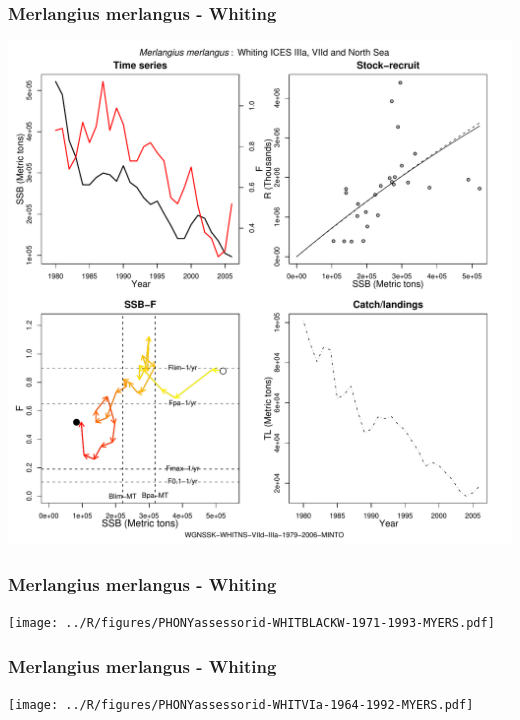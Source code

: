 \subsubsection{Merlangius merlangus - Whiting}
\begin{center}
\includegraphics[width=1.2\textwidth]{../R/figures/WGNSSK-WHITNS-VIId-IIIa-1979-2006-MINTO.pdf}
\end{center}

\subsubsection{Merlangius merlangus - Whiting}
\begin{center}
\texttt{[image: ../R/figures/PHONYassessorid-WHITBLACKW-1971-1993-MYERS.pdf]}
\end{center}

\subsubsection{Merlangius merlangus - Whiting}
\begin{center}
\texttt{[image: ../R/figures/PHONYassessorid-WHITVIa-1964-1992-MYERS.pdf]}
\end{center}

